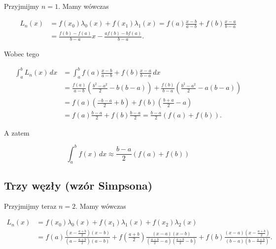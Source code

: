 \documentclass{article}
\theoremstyle{definition}
\begin{document}
Przyjmijmy \(n = 1\). Mamy wówczas 

\begin{align*}
      L_n(x) &= f(x_0)\lambda_0(x) + f(x_1)\lambda_1(x) = 
      f(a) \frac{x-b}{a-b} + f(b)\frac{x-a}{b-a} \\
      &= \frac{f(b) - f(a)}{b-a}x - \frac{af(b) - bf(a)}{b-a} \text{.}
\end{align*}

\noindent Wobec tego


\begin{align*}
    \int_a^b L_n(x) \,dx &= \int_a^b f(a) \frac{x-b}{a-b} + f(b)\frac{x-a}{b-a} \,dx \\
    &= \frac{f(a)}{a-b}\left( \frac{b^2-a^2}{2}-b(b-a) \right) + \frac{f(b)}{b-a}\left( \frac{b^2-a^2}{2} - a(b-a) \right) \\
    &= f(a) \left( \frac{-b-a}{2} + b \right) + f(b) \left( \frac{b+a}{2} - a \right) \\
    &= f(a) \frac{b-a}{2} + f(b) \frac{b-a}{2} = \frac{b-a}{2}(f(a) + f(b)) \text{.}
\end{align*}

\noindent A zatem 

\begin{equation}\tag{WTrap}
    \label{wzor_trapezow}
    \int_a^b f(x) \,dx \approx  \frac{b-a}{2}(f(a) + f(b))
\end{equation}

\subsection{Trzy węzły (wzór Simpsona)}

Przyjmijmy teraz \(n = 2\). Mamy wówczas

\begin{align*}
    L_n(x) &= f(x_0)\lambda_0(x) + f(x_1)\lambda_1(x) + f(x_2) \lambda_2(x)  \\
     &= f(a) \frac{(x-\frac{a+b}{2})(x-b)}{(a-\frac{a+b}{2})(a-b)} 
      + f\left( \frac{a+b}{2} \right)\frac{(x-a)(x-b)}{(\frac{a+b}{2}-a)(\frac{a+b}{2}-b)} 
      + f(b)\frac{(x-a)(x-\frac{a+b}{2})}{(b-a)(b-\frac{a+b}{2})}  \text{.}
\end{align*}
\end{document}
